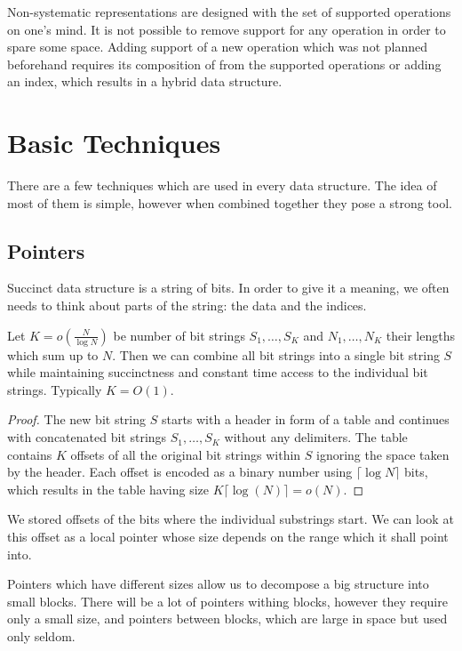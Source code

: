 Non-systematic representations are designed with the set of supported operations on one's mind.
It is not possible to remove support for any operation in order to spare some space.
Adding support of a new operation which was not planned beforehand requires its composition of from the supported operations or adding an index, which results in a hybrid data structure.

\section{Basic Techniques}

There are a few techniques which are used in every data structure.
The idea of most of them is simple, however when combined together they pose a strong tool.

\subsection{Pointers}

Succinct data structure is a string of bits.
In order to give it a meaning, we often needs to think about parts of the string: the data and the indices.

\begin{lemma}
	Let $K = o(\frac{N}{\log N})$ be number of bit strings $S_1, \ldots, S_K$ and $N_1, \dots, N_K$ their lengths which sum up to $N$.
	Then we can combine all bit strings into a single bit string $S$ while maintaining succinctness and constant time access to the individual bit strings.
	Typically $K = O(1)$.
\end{lemma}
\begin{proof}
	The new bit string $S$ starts with a header in form of a table and continues with concatenated bit strings $S_1, \ldots, S_K$ without any delimiters.
	The table contains $K$ offsets of all the original bit strings within $S$ ignoring the space taken by the header.
	Each offset is encoded as a binary number using $\lceil \log N \rceil$ bits, which results in the table having size $K \lceil \log (N) \rceil = o(N)$.
\end{proof}

We stored offsets of the bits where the individual substrings start.
We can look at this offset as a local pointer whose size depends on the range which it shall point into.

Pointers which have different sizes allow us to decompose a big structure into small blocks.
There will be a lot of pointers withing blocks, however they require only a small size, and pointers between blocks, which are large in space but used only seldom.

